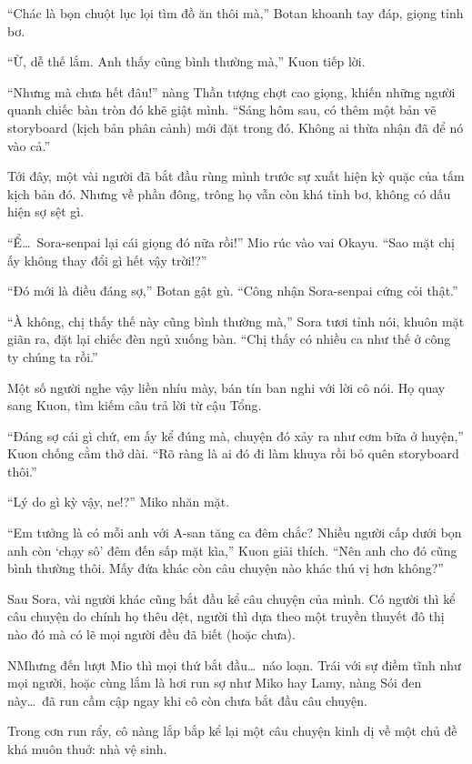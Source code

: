 \documentclass[../main.tex]{subfiles}
\begin{document}
``Chác là bọn chuột lục lọi tìm đồ ăn thôi mà,'' Botan khoanh tay đáp, giọng tỉnh bơ.

``Ừ, dễ thế lắm. Anh thấy cũng bình thường mà,'' Kuon tiếp lời.

``Nhưng mà chưa hết đâu!'' nàng Thần tượng chợt cao giọng, khiến những người quanh chiếc bàn tròn đó khẽ giật mình. ``Sáng hôm sau, có thêm một bản vẽ storyboard (kịch bản phân cảnh) mới đặt trong đó. Không ai thừa nhận đã để nó vào cả.''

Tới đây, một vài người đã bắt đầu rùng mình trước sự xuất hiện kỳ quặc của tấm kịch bản đó. Nhưng về phần đông, trông họ vẫn còn khá tỉnh bơ, không có dấu hiện sợ sệt gì.

``Ể\dots\ Sora-senpai lại cái giọng đó nữa rồi!'' Mio rúc vào vai Okayu. ``Sao mặt chị ấy không thay đổi gì hết vậy trời!?''

``Đó mới là điều đáng sợ,'' Botan gật gù. ``Công nhận Sora-senpai cứng cỏi thật.''

``À không, chị thấy thế này cũng bình thường mà,'' Sora tươi tỉnh nói, khuôn mặt giãn ra, đặt lại chiếc đèn ngủ xuống bàn. ``Chị thấy có nhiều ca như thế ở công ty chúng ta rồi.''

Một số người nghe vậy liền nhíu mày, bán tín ban nghi với lời cô nói. Họ quay sang Kuon, tìm kiếm câu trả lời từ cậu Tổng.

``Đáng sợ cái gì chứ, em ấy kể đúng mà, chuyện đó xảy ra như cơm bữa ở huyện,'' Kuon chống cằm thở dài. ``Rõ ràng là ai đó đi làm khuya rồi bỏ quên storyboard thôi.''

``Lý do gì kỳ vậy, ne!?'' Miko nhăn mặt.

``Em tưởng là có mỗi anh với A-san tăng ca đêm chắc? Nhiều người cấp dưới bọn anh còn `chạy sô' đêm đến sấp mặt kìa,'' Kuon giải thích. ``Nên anh cho đó cũng bình thường thôi. Mấy đứa khác còn câu chuyện nào khác thú vị hơn không?''

Sau Sora, vài người khác cũng bắt đầu kể câu chuyện của mình. Có người thì kể câu chuyện do chính họ thêu dệt, người thì dựa theo một truyền thuyết đô thị nào đó mà có lẽ mọi người đều đã biết (hoặc chưa).

NMhưng đến lượt Mio thì mọi thứ bắt đầu\dots\ náo loạn. Trái với sự điềm tĩnh như mọi người, hoặc cùng lắm là hơi run sợ như Miko hay Lamy, nàng Sói đen này\dots\ đã run cầm cập ngay khi cô còn chưa bắt đầu câu chuyện.

Trong cơn run rẩy, cô nàng lắp bắp kể lại một câu chuyện kinh dị về một chủ đề khá muôn thuở: nhà vệ sinh.
\end{document}
